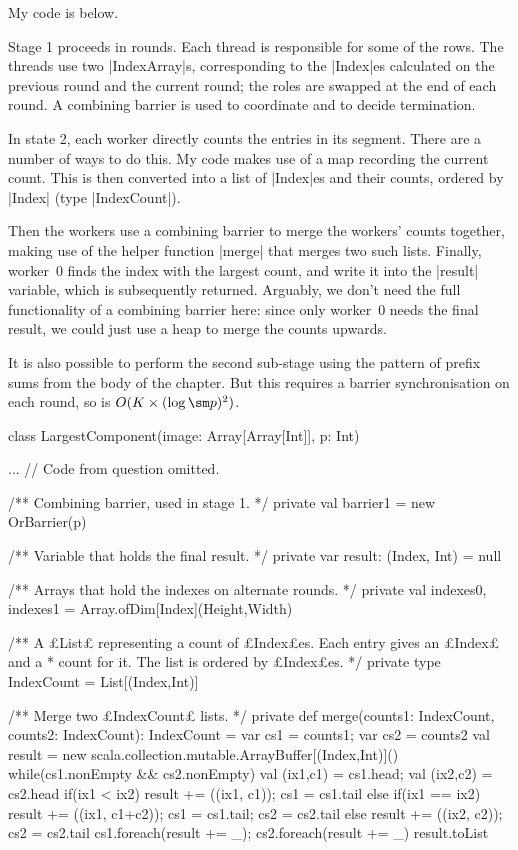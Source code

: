 
\begin{answerI}
My code is below.  

Stage 1 proceeds in rounds.  Each thread is responsible for some of the rows.
The threads use two |IndexArray|s, corresponding to the |Index|es calculated
on the previous round and the current round; the roles are swapped at the end
of each round.  A combining barrier is used to coordinate and to decide
termination.

In state 2, each worker directly counts the entries in its segment.  There are
a number of ways to do this.  My code makes use of a map recording the current
count.  This is then converted into a list of |Index|es and their counts,
ordered by |Index| (type |IndexCount|).

Then the workers use a combining barrier to merge the workers' counts
together, making use of the helper function |merge| that merges two such
lists.  Finally, worker~0 finds the index with the largest count, and write it
into the |result| variable, which is subsequently returned.  Arguably, we
don't need the full functionality of a combining barrier here: since only
worker~0 needs the final result, we could just use a heap to merge the counts
upwards.

It is also possible to perform the second sub-stage using the pattern of
prefix sums from the body of the chapter.  But this requires a barrier
synchronisation on each round, so is  $O(K \times (\log \sm p)^2)$.



\begin{scala}
class LargestComponent(image: Array[Array[Int]], p: Int){
  ... // Code from question omitted. 

  /** Combining barrier, used in stage 1. */
  private val barrier1 = new OrBarrier(p)

  /** Variable that holds the final result. */
  private var result: (Index, Int) = null

  /** Arrays that hold the indexes on alternate rounds. */
  private val indexes0, indexes1 = Array.ofDim[Index](Height,Width)

  /** A £List£ representing a count of £Index£es.  Each entry gives an £Index£ and a
    * count for it.  The list is ordered by £Index£es. */
  private type IndexCount = List[(Index,Int)]

  /** Merge two £IndexCount£ lists. */
  private def merge(counts1: IndexCount, counts2: IndexCount): IndexCount = {
    var cs1 = counts1; var cs2 = counts2
    val result = new scala.collection.mutable.ArrayBuffer[(Index,Int)]()
    while(cs1.nonEmpty && cs2.nonEmpty){
      val (ix1,c1) = cs1.head; val (ix2,c2) = cs2.head
      if(ix1 < ix2){ result += ((ix1, c1)); cs1 = cs1.tail }
      else if(ix1 == ix2){ 
        result += ((ix1, c1+c2)); cs1 = cs1.tail; cs2 = cs2.tail 
      }
      else{ result += ((ix2, c2)); cs2 = cs2.tail }
    }
    cs1.foreach(result += _); cs2.foreach(result += _)
    result.toList
  }

}
\end{scala}
\end{answerI}
